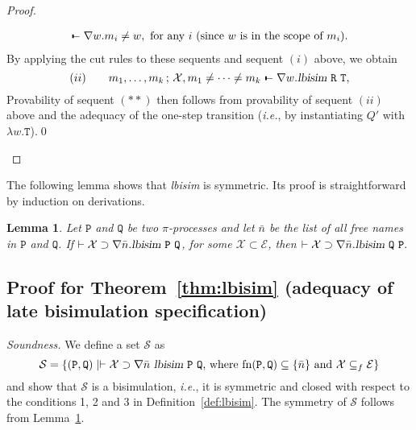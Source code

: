 \documentclass{acmtrans2m}
\newtheorem{lemma}[theorem]{Lemma}
\newcommand{\ie}{{\em i.e.}}
\def\Escr{{\mathcal E}}
\def\Sscr{{\mathcal S}}
\def\Xscr{{\mathcal X}}
\def\Ppi{{\mathtt P}}
\def\Qpi{{\mathtt Q}}
\def\Rpi{{\mathtt R}}
\def\Tpi{{\mathtt T}}
\def\relbar{\mathrel{\smash-}}
\def\joinrelm{\mathrel{\mkern-3.2mu}}
\def\tailpiece{\kern 1pt\vrule height 1ex width 0.3ex depth -.25ex}
\def\seqsym{\mathrel{\tailpiece\joinrelm\relbar}}
\newcommand{\NSeq}[3]{#1\,;\,#2 \seqsym #3}
\newcommand{\lbisim}[2]{\hbox{\sl lbisim}~#1~#2}
\newcommand{\oimp}{\supset}
\newcommand{\fn}[1]{{\rm fn}(#1)}
\begin{document}
\begin{proof}
\begin{description}
$$\begin{array}{l}
\seqsym \nabla w. m_i \not = w, \hbox{ for any $i$ (since $w$ is in the scope of $m_i$).}
\end{array}
$$
By applying the cut rules to these sequents and sequent $(i)$ above, we
obtain
$$
(ii) \qquad \NSeq{m_1,\ldots,m_k}{\Xscr, m_1 \not = \cdots \not = m_k}{\nabla w. \lbisim{\Rpi}{\Tpi}},
$$
Provability of sequent $(**)$ then follows from provability of sequent $(ii)$ above
and the adequacy of the one-step transition (\ie, by instantiating $Q'$
with $\lambda w.\Tpi$).\qed
\end{description}
\end{proof}

The following lemma shows that {\em lbisim} is symmetric. Its proof is
straightforward by induction on derivations. 

\begin{lemma}
\label{lm:lbisim-sym}
Let $\Ppi$ and $\Qpi$ be two $\pi$-processes and let $\bar n$ be the
list of all free names in $\Ppi$ and $\Qpi$.
If $\vdash \Xscr \oimp \nabla \bar n. \lbisim \Ppi \Qpi$, for
some $\Xscr \subset \Escr$, then 
$\vdash \Xscr \oimp \nabla \bar n. \lbisim \Qpi \Ppi.$
\end{lemma}


\subsection{Proof for Theorem~\ref{thm:lbisim} (adequacy of late bisimulation specification)}

{\em Soundness.} 
We define a set $\Sscr$ as
$$
\Sscr = \{ (\Ppi, \Qpi) \mid \vdash \Xscr \oimp \nabla \bar{n}\ \lbisim{\Ppi}{\Qpi} \mbox{, where 
$\fn{\Ppi, \Qpi} \subseteq \{\bar{n}\}$ and $\Xscr \subseteq_f \Escr$} \}
$$
and show that $\Sscr$ is a bisimulation, \ie, it is symmetric and 
closed with respect to the conditions 1, 2 and 3 in Definition~\ref{def:lbisim}.
The symmetry of $\Sscr$ follows from Lemma~\ref{lm:lbisim-sym}.
\end{document}

